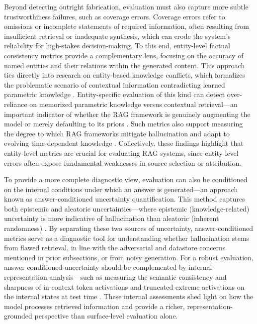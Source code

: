 \documentclass[11pt]{article}
\begin{document}
Beyond detecting outright fabrication, evaluation must also capture more subtle trustworthiness failures, such as coverage errors. Coverage errors refer to omissions or incomplete statements of required information, often resulting from insufficient retrieval or inadequate synthesis, which can erode the system's reliability for high-stakes decision-making. To this end, entity-level factual consistency metrics provide a complementary lens, focusing on the accuracy of named entities and their relations within the generated content. This approach ties directly into research on entity-based knowledge conflicts, which formalizes the problematic scenario of contextual information contradicting learned parametric knowledge \cite{ref168}. Entity-specific evaluation of this kind can detect over-reliance on memorized parametric knowledge versus contextual retrieval---an important indicator of whether the RAG framework is genuinely augmenting the model or merely defaulting to its priors \cite{ref168}. Such metrics also support measuring the degree to which RAG frameworks mitigate hallucination and adapt to evolving time-dependent knowledge \cite{ref168}. Collectively, these findings highlight that entity-level metrics are crucial for evaluating RAG systems, since entity-level errors often expose fundamental weaknesses in source selection or attribution.

To provide a more complete diagnostic view, evaluation can also be conditioned on the internal conditions under which an answer is generated---an approach known as answer-conditioned uncertainty quantification. This method captures both epistemic and aleatoric uncertainties---where epistemic (knowledge-related) uncertainty is more indicative of hallucination than aleatoric (inherent randomness) \cite{ref169}. By separating these two sources of uncertainty, answer-conditioned metrics serve as a diagnostic tool for understanding whether hallucination stems from flawed retrieval, in line with the adversarial and datastore concerns mentioned in prior subsections, or from noisy generation. For a robust evaluation, answer-conditioned uncertainty should be complemented by internal representation analysis---such as measuring the semantic consistency and sharpness of in-context token activations \cite{ref142} and truncated extreme activations on the internal states at test time \cite{ref134}. These internal assessments shed light on how the model processes retrieved information and provide a richer, representation-grounded perspective than surface-level evaluation alone.
\end{document}
